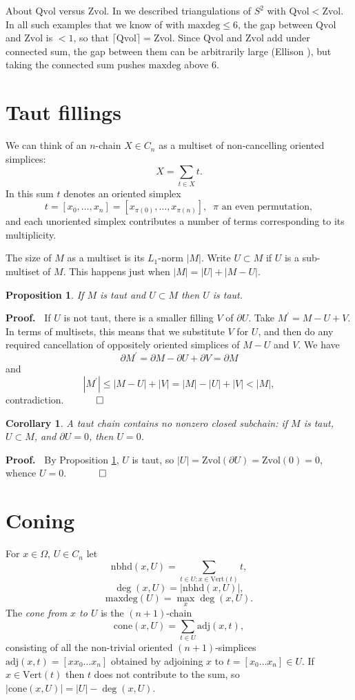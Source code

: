 \documentclass[12pt]{article}
\newtheorem{prop}{Proposition}
\newtheorem{corollary}{Corollary}
\newcommand{\proofstart}{{\noindent \bf Proof.\ }}
\newcommand{\proofend}{$\quad \qed$}
\def\del{\partial}
\newcommand{\kw}{\mathrm}
\newcommand{\cone}{\kw{cone}}
\newcommand{\maxdeg}{\kw{maxdeg}}
\newcommand{\vertices}{\kw{Vert}}
\newcommand{\nbhd}{\kw{nbhd}}
\newcommand{\adj}{\kw{adj}}
\newcommand{\Zvol}{\kw{Zvol}}
\newcommand{\Qvol}{\kw{Qvol}}
\begin{document}
About $\Qvol$ versus $\Zvol$.
In \cite{dew:filling}
we described triangulations of $S^2$ with $\Qvol < \Zvol$.
In all such examples that we know of
with $\maxdeg \leq 6$, the gap between $\Qvol$ and $\Zvol$ is $<1$,
so that
$\lceil \Qvol \rceil = \Zvol$.
Since $\Qvol$ and $\Zvol$
add under connected sum,
the gap between them can be arbitrarily
large
(Ellison \cite{ellison:gap}),
but taking the connected sum pushes $\maxdeg$ above $6$.



\section{Taut fillings}

We can think of an $n$-chain $X \in C_n$ as a multiset of
non-cancelling oriented simplices:
\[
X = \sum_{t \in X} t
.
\]
In this sum $t$ denotes an oriented simplex
\[
t=[x_0,\ldots,x_n]
= [x_{\pi(0)},\ldots,x_{\pi(n)}]
,\;\;\mbox{$\pi$ an even permutation}
,
\]
and each unoriented simplex contributes a number of terms corresponding
to its multiplicity.

The size of $M$ as a multiset is its $L_1$-norm $|M|$.
Write $U \subset M$
if $U$ is a sub-multiset of $M$.
This happens just when
$|M| = |U| + |M-U|$.

\begin{prop} \label{subtaut}
If $M$ is taut and $U \subset M$ then $U$ is taut.
\end{prop}

\proofstart
If $U$ is not taut, there is a smaller filling $V$ of $\del U$.
Take $M^\prime = M-U+V$.
In terms of multisets, this means that we substitute $V$ for $U$,
and then do any required cancellation of oppositely oriented simplices
of $M-U$ and $V$.
We have
\[
\del M^\prime = \del M - \del U + \del V = \del M
\]
and
\[
|M^\prime| \leq |M-U| + |V| = |M| - |U| + |V| < |M|
,
\]
contradiction.
\proofend

\begin{corollary} \label{nosubcycle}
A taut chain contains no nonzero closed subchain: if $M$ is taut,
$U \subset M$, and $\del U = 0$, then $U = 0$.
\end{corollary}

\proofstart
By Proposition \ref{subtaut}, $U$ is taut, so
$|U| = \Zvol(\del U) = \Zvol(0) = 0$, whence $U = 0$.
\proofend

\section{Coning}
For $x \in \Omega$, $U \in C_n$ let
\[
\nbhd(x,U) = \sum_{ t \in U: x \in \vertices(t) } t
,
\]
\[
\deg(x,U) = |\nbhd(x,U)|
,
\]
\[
\maxdeg(U) = \max_x \deg(x,U)
.
\]
The \emph{cone from $x$ to $U$}
is the $(n+1)$-chain
\[
\cone(x,U) = 
\sum_{t \in U} \adj(x,t)
,
\]
consisting of all the non-trivial oriented
$(n+1)$-simplices $\adj(x,t)=[x x_0\ldots x_n]$ obtained
by adjoining $x$ to  $t = [x_0\ldots x_n] \in U$.
If $x \in \vertices(t)$ then $t$ does not contribute to the sum,
so $|\cone(x,U)| = |U| - \deg(x,U)$.
\end{document}
